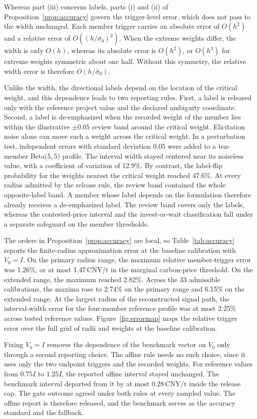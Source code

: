 \documentclass[5p,times,authoryear]{elsarticle}
\theoremstyle{plain}
\newcommand{\sbar}{\bar{\sigma}_0}
\begin{document}
Whereas part (iii) concerns labels, parts (i) and (ii) of Proposition~\ref{prop:accuracy} govern the trigger-level error, which does not pass to the width unchanged. Each member trigger carries an absolute error of $O(h^{2})$ and a relative error of $O((h/\sbar)^{2})$. When the extreme weights differ, the width is only $O(h)$, whereas its absolute error is $O(h^{2})$, or $O(h^{3})$ for extreme weights symmetric about one half. Without this symmetry, the relative width error is therefore $O(h/\sbar)$.

Unlike the width, the directional labels depend on the location of the critical weight, and this dependence leads to two reporting rules. First, a label is released only with the reference project value and the declared ambiguity coordinate. Second, a label is de-emphasized when the recorded weight of the member lies within the illustrative $\pm0.05$ review band around the critical weight. Elicitation noise alone can move such a weight across the critical weight. In a perturbation test, independent errors with standard deviation 0.05 were added to a ten-member Beta(5,\,5) profile. The interval width stayed centered near its noiseless value, with a coefficient of variation of 12.9\%. By contrast, the label-flip probability for the weights nearest the critical weight reached 47.6\%. At every radius admitted by the release rule, the review band contained the whole opposite-label band. A member whose label depends on the formulation therefore already receives a de-emphasized label. The review band covers only the labels, whereas the contested-price interval and the invest-or-wait classification fall under a separate safeguard on the member thresholds.

The orders in Proposition~\ref{prop:accuracy} are local, so Table~\ref{tab:accuracy} reports the finite-radius approximation error at the baseline calibration with $V_0=I$. On the primary radius range, the maximum relative member-trigger error was 1.26\%, or at most 1.47\,CNY/t in the marginal carbon-price threshold. On the extended range, the maximum reached 2.82\%. Across the 33 admissible calibrations, the maxima rose to 2.74\% on the primary range and 6.15\% on the extended range. At the largest radius of the reconstructed signal path, the interval-width error for the four-member reference profile was at most 2.25\% across tested reference values. Figure~\ref{fig:errormap} maps the relative trigger error over the full grid of radii and weights at the baseline calibration.

Fixing $V_0=I$ removes the dependence of the benchmark vector on $V_0$ only through a second reporting choice. The affine rule needs no such choice, since it uses only the two endpoint triggers and the recorded weights. For reference values from $0.75I$ to $1.25I$, the reported affine interval stayed unchanged. The benchmark interval departed from it by at most 0.28\,CNY/t inside the release cap. The gate outcome agreed under both rules at every sampled value. The affine report is therefore released, and the benchmark serves as the accuracy standard and the fallback.
\end{document}

